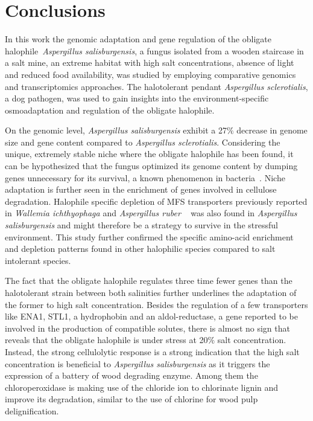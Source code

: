 \documentclass[jof,article,submit,moreauthors,pdftex,10pt,a4paper]{Definitions/mdpi}
\newcommand{\aspRub}{\textit{Aspergillus ruber}}
\newcommand{\walIch}{\textit{Wallemia ichthyophaga}}
\newcommand{\phiSp}{\textit{Aspergillus salisburgensis}}
\newcommand{\phiScl}{\textit{Aspergillus sclerotialis}}
\begin{document}
\section{Conclusions}
In this work the genomic adaptation and gene regulation of the obligate halophile~\phiSp{}, a fungus isolated from a wooden staircase in a salt mine, an extreme habitat with high salt concentrations, absence of light and reduced food availability, was studied by employing comparative genomics and transcriptomics approaches. The halotolerant pendant \phiScl{}, a dog pathogen, was used to gain insights into the environment-specific osmoadaptation and regulation of the obligate halophile. 

On the genomic level, \phiSp{} exhibit a 27$\%$ decrease in genome size and gene content compared to \phiScl{}. Considering the unique, extremely stable niche where the obligate halophile has been found, it can be hypothesized that the fungus optimized its genome content by dumping genes unnecessary for its survival, a known phenomenon in bacteria~\cite{Stepkowski2001}. Niche adaptation is further seen in the enrichment of genes involved in cellulose degradation. Halophile specific depletion of MFS transporters previously reported in \walIch{} and \aspRub{} ~\cite{Plemenitas2014,Kis-Papo2014-dn} was also found in \phiSp{} and might therefore be a strategy to survive in the stressful environment. This study further confirmed the specific amino-acid enrichment and depletion patterns found in other halophilic species compared to salt intolerant species.

The fact that the obligate halophile regulates three time fewer genes than the halotolerant strain between both salinities further underlines the adaptation of the former to high salt concentration. Besides the regulation of a few transporters like ENA1, STL1, a hydrophobin and an aldol-reductase, a gene reported to be involved in the production of compatible solutes, there is almost no sign that reveals that the obligate halophile is under stress at 20$\%$ salt concentration. Instead, the strong cellulolytic response is a strong indication that the high salt concentration is beneficial to \phiSp{} as it triggers the expression of a battery of wood degrading enzyme. Among them the chloroperoxidase is making use of the chloride ion to chlorinate lignin and improve its degradation, similar to the use of chlorine for wood pulp delignification. 
\end{document}
